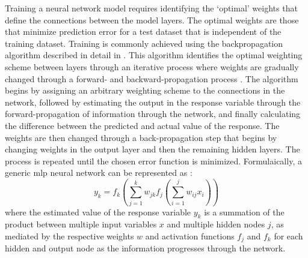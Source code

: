\documentclass[article]{jss}\usepackage[]{graphicx}\usepackage[]{color}
\begin{document}
Training a neural network model requires identifying the `optimal' weights that define the connections between the model layers.  The optimal weights are those that minimize prediction error for a test dataset that is independent of the training dataset.  Training is commonly achieved using the backpropagation algorithm described in detail in \citep{Rumelhart86}.  This algorithm identifies the optimal weighting scheme between layers through an iterative process where weights are gradually changed through a forward- and backward-propagation process \citep{Rumelhart86,Lek00}.  The algorithm begins by assigning an arbitrary weighting scheme to the connections in the network, followed by estimating the output in the response variable through the forward-propagation of information through the network, and finally calculating the difference between the predicted and actual value of the response.  The weights are then changed through a back-propagation step that begins by changing weights in the output layer and then the remaining hidden layers.  The process is repeated until the chosen error function is minimized.  Formulaically, a generic \ac{mlp} neural network can be represented as \citep{Ripley96}:
\begin{equation}
y_k = f_k \left(\sum\limits_{j=1}^k w_{jk}f_j \left( \sum\limits_{i=1}^j w_{ij}x_i\right) \right)
\end{equation}
where the estimated value of the response variable $y_k$ is a summation of the product between multiple input variables $x$ and multiple hidden nodes $j$, as mediated by the respective weights $w$ and activation functions $f_j$ and $f_k$ for each hidden and output node as the information progresses through the network.
\end{document}
